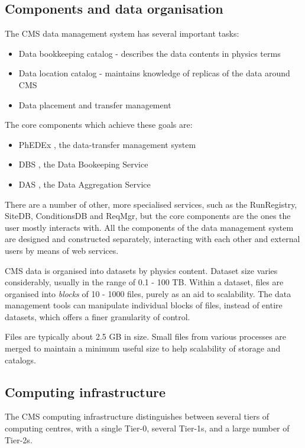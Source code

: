 \subsection{Components and data organisation}
The CMS data management system has several important tasks:
\begin{itemize}
  \item Data bookkeeping catalog - describes the data contents in physics terms
  \item Data location catalog - maintains knowledge of replicas of the data around CMS
  \item Data placement and transfer management
\end{itemize}

The core components which achieve these goals are:
\begin{itemize}
  \item PhEDEx \cite{PhEDEx}, the data-transfer management system
  \item DBS \cite{DBS}, the Data Bookeeping Service
  \item DAS \cite{DAS}, the Data Aggregation Service
\end{itemize}

There are a number of other, more specialised services, such as the RunRegistry, SiteDB, 
ConditionsDB and ReqMgr, but the core components are the ones the user mostly interacts with. All 
the components of the data management system are designed and constructed separately, interacting 
with each other and external users by means of web services.

CMS data is organised into datasets by physics content. Dataset size varies considerably, usually 
in the range of 0.1 - 100 TB. Within a dataset, files are organised into {\it blocks} of 10 - 1000 
files, purely as an aid to scalability. The data management tools can manipulate individual blocks 
of files, instead of entire datasets, which offers a finer granularity of control.

Files are typically about 2.5 GB in size. Small files from various processes are merged to 
maintain a minimum useful size to help scalability of storage and catalogs.

\subsection{Computing infrastructure}
The CMS computing infrastructure distinguishes between several tiers of computing centres, with a
single Tier-0, several Tier-1s, and a large number of Tier-2s.


